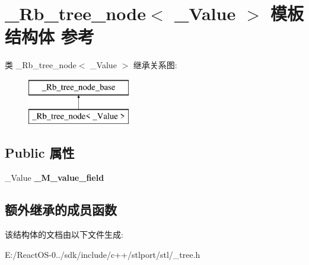 \hypertarget{struct___rb__tree__node}{}\section{\+\_\+\+Rb\+\_\+tree\+\_\+node$<$ \+\_\+\+Value $>$ 模板结构体 参考}
\label{struct___rb__tree__node}
类 \+\_\+\+Rb\+\_\+tree\+\_\+node$<$ \+\_\+\+Value $>$ 继承关系图\+:\begin{figure}[H]
\begin{center}
\leavevmode
\includegraphics[height=2.000000cm]{struct___rb__tree__node}
\end{center}
\end{figure}
\subsection*{Public 属性}
\begin{DoxyCompactItemize}
\item 
\mbox{\label{struct___rb__tree__node_aee9d9858d84f5e7124911c074899bd20}} 
\+\_\+\+Value {\bfseries \+\_\+\+M\+\_\+value\+\_\+field}
\end{DoxyCompactItemize}
\subsection*{额外继承的成员函数}


该结构体的文档由以下文件生成\+:\begin{DoxyCompactItemize}
\item 
E\+:/\+React\+O\+S-\/0../sdk/include/c++/stlport/stl/\+\_\+tree.\+h\end{DoxyCompactItemize}
